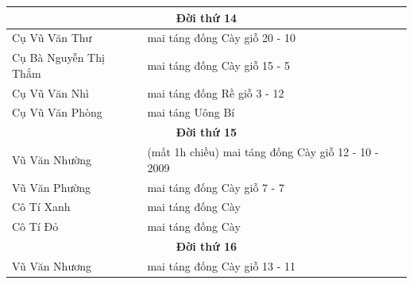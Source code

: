 \documentclass[11pt]{article}
\begin{document}
\begin{longtable}{|p{}|p{}|}
\multicolumn{2}{|c|}{\textbf{Đời thứ 14}} \\ \hline
Cụ Vũ Văn Thư & mai táng đống Cày giỗ 20 - 10 \\ \hline
Cụ Bà Nguyễn Thị Thắm & mai táng đống Cày giỗ 15 - 5 \\ \hline
Cụ Vũ Văn Nhì & mai táng đống Rề giỗ 3 - 12 \\ \hline
Cụ Vũ Văn Phòng & mai táng Uông Bí \\ \hline

\multicolumn{2}{|c|}{\textbf{Đời thứ 15}} \\ \hline
Vũ Văn Nhường & (mất 1h chiều) mai táng đống Cày giỗ 12 - 10 - 2009 \\ \hline
Vũ Văn Phường & mai táng đống Cày giỗ 7 - 7 \\ \hline
Cô Tí Xanh & mai táng đống Cày \\ \hline
Cô Tí Đỏ & mai táng đống Cày \\ \hline

\multicolumn{2}{|c|}{\textbf{Đời thứ 16}} \\ \hline
Vũ Văn Nhương & mai táng đống Cày giỗ 13 - 11 \\ \hline

\end{longtable}
\end{document}
